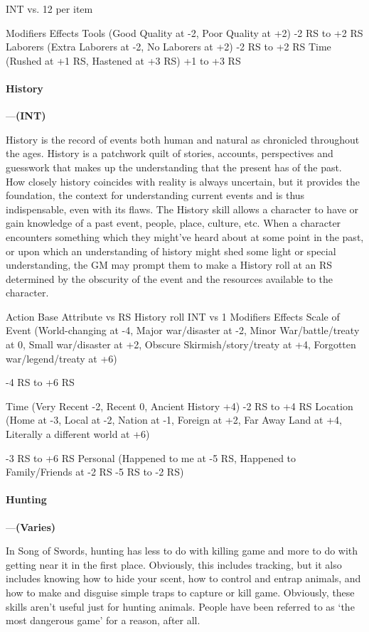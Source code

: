 \documentclass[oneside,11pt,english]{book}
\begin{document}
INT vs. 12 per item 

Modifiers Effects 
Tools (Good Quality at -2, Poor Quality at +2) -2 RS to +2 RS 
Laborers (Extra Laborers at -2, No Laborers at +2) -2 RS to +2 RS 
Time (Rushed at +1 RS, Hastened at +3 RS) +1 to +3 RS 

 

 

\paragraph{\label{skill:History}History}---\quad\textbf{(INT) }\par
History is the record of events both human and natural as chronicled throughout the ages. History is a patchwork quilt of stories, accounts, perspectives and guesswork that makes up the understanding that the present has of the past. How closely history coincides with reality is always uncertain, but it provides the foundation, the context for understanding current events and is thus indispensable, even with its flaws. The History skill allows a character to have or gain knowledge of a past event, people, place, culture, etc. When a character encounters something which they might’ve heard about at some point in the past, or upon which an understanding of history might shed some light or special understanding, the GM may prompt them to make a History roll at an RS determined by the obscurity of the event and the resources available to the character.


Action Base 
Attribute vs 
RS 
History roll INT vs 1 
Modifiers Effects 
Scale of Event (World-changing at -4, Major war/disaster at -2, Minor War/battle/treaty 
at 0, Small war/disaster at +2, Obscure Skirmish/story/treaty at +4, Forgotten 
war/legend/treaty at +6) 

-4 RS to +6 
RS 

Time (Very Recent -2, Recent 0, Ancient History +4) -2 RS to +4 
RS 
Location (Home at -3, Local at -2, Nation at -1, Foreign at +2, Far Away Land at +4, 
Literally a different world at +6) 

-3 RS to +6 
RS 
Personal (Happened to me at -5 RS, Happened to Family/Friends at -2 RS -5 RS to -2 
RS)

 

 

\paragraph{\label{skill:Hunting}Hunting}---\quad\textbf{(Varies) }\par
In Song of Swords, hunting has less to do with killing game and more to do with getting near it in the first place. Obviously, this includes tracking, but it also includes knowing how to hide your scent, how to control and entrap animals, and how to make and disguise simple traps to capture or kill game. Obviously, these skills aren’t useful just for hunting animals. People have been referred to as ‘the most dangerous game’ for a reason, after all.
\end{document}
